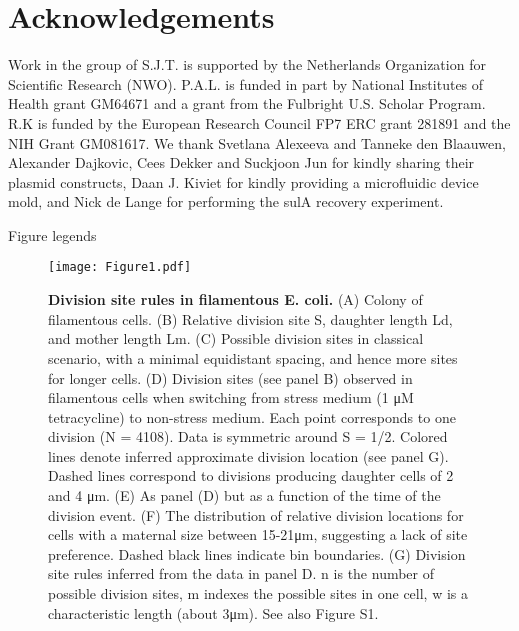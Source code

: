 \section*{Acknowledgements}
Work in the group of S.J.T. is supported by the Netherlands Organization for Scientific Research (NWO). P.A.L. is funded in part by  National Institutes of Health grant GM64671 and a grant from the Fulbright U.S. Scholar Program. R.K is funded by the European Research Council FP7 ERC grant 281891 and the NIH Grant GM081617. We thank Svetlana Alexeeva and Tanneke den Blaauwen, Alexander Dajkovic, Cees Dekker and Suckjoon Jun for kindly sharing their plasmid constructs, Daan J. Kiviet for kindly providing a microfluidic device mold, and Nick de Lange for performing the sulA recovery experiment. 





Figure legends

\begin{figure}
    \centering
    \texttt{[image: Figure1.pdf]}
    \caption{ 
        \textbf{Division site rules in filamentous E. coli.} 
(A) Colony of filamentous cells. (B) Relative division site S, daughter length Ld, and mother length Lm. (C) Possible division sites in classical scenario, with a minimal equidistant spacing, and hence more sites for longer cells. (D) Division sites (see panel B) observed in filamentous cells when switching from stress medium (1 μM tetracycline) to non-stress medium. Each point corresponds to one division (N = 4108). Data is symmetric around S = 1/2. Colored lines denote inferred approximate division location (see panel G). Dashed lines correspond to divisions producing daughter cells of 2 and 4 μm. (E) As panel (D) but as a function of the time of the division event. (F) The distribution of relative division locations for cells with a maternal size between 15-21μm, suggesting a lack of site preference. Dashed black lines indicate bin boundaries. (G) Division site rules inferred from the data in panel D. n is the number of possible division sites, m indexes the possible sites in one cell, w is a characteristic length (about 3μm). See also Figure S1.        
    }
    \label{fig:filarecovery:fig1}
\end{figure}

